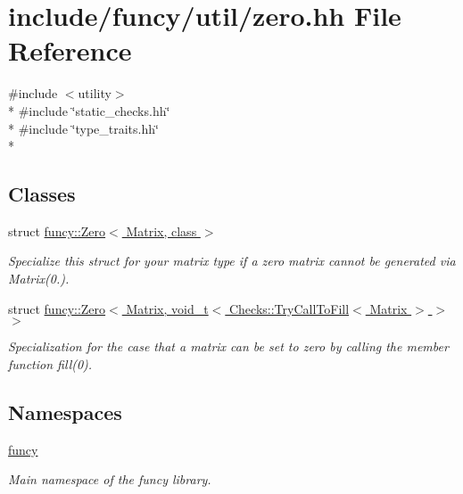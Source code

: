 \hypertarget{zero_8hh}{\section{include/funcy/util/zero.hh File Reference}
\label{zero_8hh}
}
{\ttfamily \#include $<$utility$>$}\\*
{\ttfamily \#include \char`\"{}static\-\_\-checks.\-hh\char`\"{}}\\*
{\ttfamily \#include \char`\"{}type\-\_\-traits.\-hh\char`\"{}}\\*
\subsection*{Classes}
\begin{DoxyCompactItemize}
\item 
struct \hyperlink{structfuncy_1_1Zero}{funcy\-::\-Zero$<$ Matrix, class $>$}
\begin{DoxyCompactList}\small\item\em Specialize this struct for your matrix type if a zero matrix cannot be generated via Matrix(0.). \end{DoxyCompactList}\item 
struct \hyperlink{structfuncy_1_1Zero_3_01Matrix_00_01void__t_3_01Checks_1_1TryCallToFill_3_01Matrix_01_4_01_4_01_4}{funcy\-::\-Zero$<$ Matrix, void\-\_\-t$<$ Checks\-::\-Try\-Call\-To\-Fill$<$ Matrix $>$ $>$ $>$}
\begin{DoxyCompactList}\small\item\em Specialization for the case that a matrix can be set to zero by calling the member function fill(0). \end{DoxyCompactList}\end{DoxyCompactItemize}
\subsection*{Namespaces}
\begin{DoxyCompactItemize}
\item 
\hyperlink{namespacefuncy}{funcy}
\begin{DoxyCompactList}\small\item\em Main namespace of the funcy library. \end{DoxyCompactList}\end{DoxyCompactItemize}
